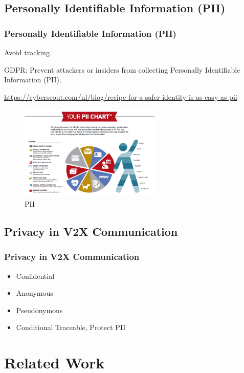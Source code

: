 \documentclass{ctexbeamer}
\begin{document}
\subsection{Personally Identifiable Information (PII)}
\begin{frame}
\frametitle{Personally Identifiable Information (PII)}

Avoid tracking.

GDPR: Prevent attackers or insiders from collecting Personally Identifiable Information (PII).

    \url{https://cyberscout.com/nl/blog/recipe-for-a-safer-identity-is-as-easy-as-pii}

    \begin{figure}[H]
        \centering 
        \includegraphics[width=0.6\textwidth]{pic/pii.png} 
        \caption{PII} 
        \label{fig.pii}
    \end{figure}

\end{frame}

\subsection{Privacy in V2X Communication}
\begin{frame}
\frametitle{Privacy in V2X Communication}

    \begin{itemize}
            \item Confidential
            \item Anonymous
            \item Pseudonymous
            \item Conditional Traceable, Protect PII
        \end{itemize}

\end{frame}

\section{Related Work}
\end{document}
